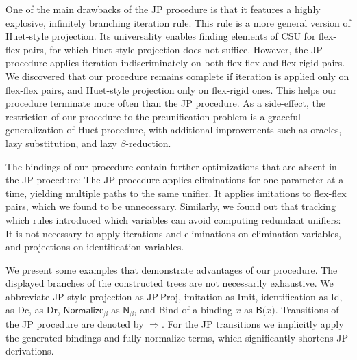One of the main drawbacks of the JP procedure is that it features a highly
explosive, infinitely branching iteration rule. This rule is a more general
version of Huet-style projection. Its universality enables finding elements of
CSU for flex-flex pairs, for which Huet-style projection does not suffice.
However, the JP procedure applies iteration indiscriminately on both flex-flex and
flex-rigid pairs. We discovered that our procedure remains complete if iteration
is applied only on flex-flex pairs, and Huet-style projection only on
flex-rigid ones. This helps our procedure terminate more often than the JP
procedure. As a side-effect, the restriction of our procedure to
the preunification problem is a graceful generalization of Huet procedure, with
additional improvements such as oracles, lazy substitution, and lazy
$\beta$-reduction.


The bindings of our procedure contain further optimizations that are absent in
the JP procedure: The JP procedure applies eliminations for one parameter
at a time, yielding multiple paths to the same unifier. It applies imitations to
flex-flex pairs, which we found to be unnecessary. Similarly, we found out that
tracking which rules introduced which variables can avoid computing redundant
unifiers: It is not necessary to apply iterations and eliminations on
elimination variables, and projections on identification variables.

We present some examples that demonstrate advantages of our procedure.
The displayed branches of the constructed trees are not necessarily exhaustive.
We abbreviate 
JP-style projection as \textsf{JP\,Proj},
imitation as \textsf{Imit},
identification as \textsf{Id},
 as \textsf{Dc}, 
 as \textsf{Dr},
$\textsf{Normalize}_\beta$ as $\textsf{N}_\beta$,
and
\textsf{Bind} of a binding $x$ as $\textsf{B(}x\textsf{)}$.
Transitions of the JP procedure are denoted by $\Longrightarrow$.
For the JP transitions we implicitly apply the generated bindings and fully
normalize terms, which significantly shortens JP derivations.

